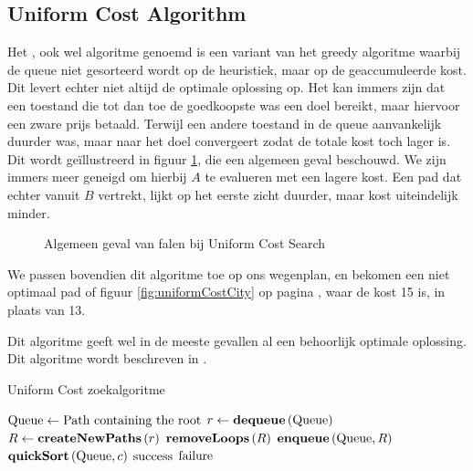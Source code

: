 \subsection{Uniform Cost Algorithm}
Het , ook wel  algoritme genoemd is een variant van het greedy algoritme waarbij de queue niet gesorteerd wordt op de heuristiek, maar op de geaccumuleerde kost. Dit levert echter niet altijd de optimale oplossing op. Het kan immers zijn dat een toestand die tot dan toe de goedkoopste was een doel bereikt, maar hiervoor een zware prijs betaald. Terwijl een andere toestand in de queue aanvankelijk duurder was, maar naar het doel convergeert zodat de totale kost toch lager is. Dit wordt ge\"illustreerd in figuur \ref{fig:badUniformCost}, die een algemeen geval beschouwd. We zijn immers meer geneigd om hierbij $A$ te evalueren met een lagere kost. Een pad dat echter vanuit $B$ vertrekt, lijkt op het eerste zicht duurder, maar kost uiteindelijk minder.
\begin{figure}[htb]
\centering
{}
\caption{Algemeen geval van falen bij Uniform Cost Search}
\label{fig:badUniformCost}
\end{figure}
\begin{leftbar}
We passen bovendien dit algoritme toe op ons wegenplan, en bekomen een niet optimaal pad of figuur \ref{fig:uniformCostCity} op pagina \pageref{fig:uniformCostCity}, waar de kost 15 is, in plaats van 13.
\end{leftbar}
Dit algoritme geeft wel in de meeste gevallen al een behoorlijk optimale oplossing. Dit algoritme wordt beschreven in .
\begin{algorithm}[htb]                      %
\caption{Uniform Cost zoekalgoritme}          %
\label{alg:uniformCost}                           %
\begin{algorithmic}[1]                    %
\STATE $\mbox{Queue}\leftarrow\mbox{Path containing the root}$
\WHILE{$\notempty{\queue}\wedge\neg\goalreached{\queue}$}
\STATE $r\leftarrow\mbox{\bf dequeue}\left( \mbox{Queue} \right)$
\STATE $R\leftarrow\mbox{\bf createNewPaths}\left( r \right)$
\STATE $\mbox{\bf removeLoops}\left( R \right)$
\STATE $\mbox{\bf enqueue}\left( \mbox{Queue},R \right)$
\STATE $\mbox{\bf quickSort}\left( \mbox{Queue},c \right)$
\ENDWHILE
\IF{$\goalreached{\queue}$}
\RETURN $\mbox{success}$
\ELSE
\RETURN $\mbox{failure}$
\ENDIF
\end{algorithmic}
\end{algorithm}
